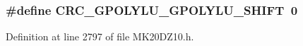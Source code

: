 \subsubsection[{\texorpdfstring{C\+R\+C\+\_\+\+G\+P\+O\+L\+Y\+L\+U\+\_\+\+G\+P\+O\+L\+Y\+L\+U\+\_\+\+S\+H\+I\+FT}{CRC_GPOLYLU_GPOLYLU_SHIFT}}]{\setlength{\rightskip}{0pt plus 5cm}\#define C\+R\+C\+\_\+\+G\+P\+O\+L\+Y\+L\+U\+\_\+\+G\+P\+O\+L\+Y\+L\+U\+\_\+\+S\+H\+I\+FT~0}\hypertarget{group___c_r_c___register___masks_ga4d6303422fb112dfad558ee2f84aa92c}{}\label{group___c_r_c___register___masks_ga4d6303422fb112dfad558ee2f84aa92c}


Definition at line 2797 of file M\+K20\+D\+Z10.\+h.

